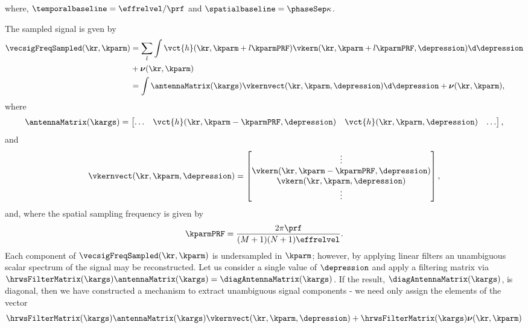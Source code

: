 where, $\temporalbaseline=\effrelvel/\prf$ and $\spatialbaseline=\phaseSep\kappa$.
\par
The sampled signal is gven by
\begin{equation}
\begin{split}
\vecsigFreqSampled(\kr, \kparm) &= \sum_l\int\vct{h}(\kr, \kparm+l\kparmPRF)\vkern(\kr,\kparm+l\kparmPRF,\depression)\d\depression\\ 
&+ \boldsymbol{\nu}(\kr, \kparm)\\
&=\int\antennaMatrix(\kargs)\vkernvect(\kr, \kparm, \depression)\d\depression+ \boldsymbol{\nu}(\kr, \kparm),
\end{split}
\end{equation}
where
\begin{equation}
	\antennaMatrix(\kargs)=
    \begin{bmatrix}
    	\hdots & \vct{h}(\kr, \kparm - \kparmPRF, \depression) & \vct{h}(\kr, \kparm, \depression) & \hdots
    \end{bmatrix},
\end{equation}
and
\begin{equation}
	\vkernvect(\kr, \kparm, \depression) = 
    \begin{bmatrix}
    	\vdots\\
        \vkern(\kr,\kparm-\kparmPRF,\depression)\\
        \vkern(\kr,\kparm,\depression)\\
        \vdots
    \end{bmatrix},
\end{equation}
and, where the spatial sampling frequency is given by
\begin{equation}
 \kparmPRF = \frac{2\pi\prf}{(M+1)(N+1)\effrelvel}.
\end{equation}
Each component of $\vecsigFreqSampled(\kr, \kparm)$ is undersampled in $\kparm$; however, by applying linear filters an unambiguous scalar spectrum of the signal may be reconstructed. Let us consider a single value of $\depression$ and apply a filtering matrix via $\hrwsFilterMatrix(\kargs)\antennaMatrix(\kargs)=\diagAntennaMatrix(\kargs)$. If the result, $\diagAntennaMatrix(\kargs)$, is diagonal, then we have constructed a mechanism to extract unambiguous signal components - we need only assign the elements of the vector
\begin{equation}
	\hrwsFilterMatrix(\kargs)\antennaMatrix(\kargs)\vkernvect(\kr, \kparm, \depression) + \hrwsFilterMatrix(\kargs)\boldsymbol{\nu}(\kr, \kparm)
\end{equation}
